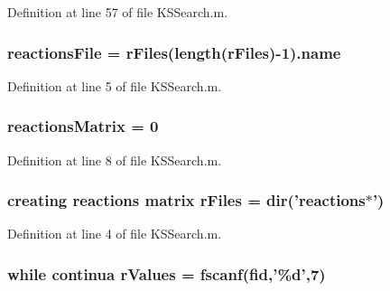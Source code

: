 Definition at line 57 of file K\-S\-Search.\-m.

\hypertarget{a00030_a4c72dba1fe2ee2fbcc699262a8d0c624}{
\subsubsection[{reactions\-File}]{\setlength{\rightskip}{0pt plus 5cm}reactions\-File = {\bf r\-Files}(length({\bf r\-Files})-\/1).{\bf name}}}\label{a00030_a4c72dba1fe2ee2fbcc699262a8d0c624}


Definition at line 5 of file K\-S\-Search.\-m.

\hypertarget{a00030_ac52097a2745fcef31eb175d2e9485845}{
\subsubsection[{reactions\-Matrix}]{\setlength{\rightskip}{0pt plus 5cm}reactions\-Matrix = 0}}\label{a00030_ac52097a2745fcef31eb175d2e9485845}


Definition at line 8 of file K\-S\-Search.\-m.

\hypertarget{a00030_ad75735665492cabd747370126464fddf}{
\subsubsection[{r\-Files}]{\setlength{\rightskip}{0pt plus 5cm}creating {\bf reactions} matrix r\-Files = dir('{\bf reactions}$\ast$')}}\label{a00030_ad75735665492cabd747370126464fddf}


Definition at line 4 of file K\-S\-Search.\-m.

\hypertarget{a00030_a436a6968124e560649654a4abbd9dac6}{
\subsubsection[{r\-Values}]{\setlength{\rightskip}{0pt plus 5cm}while {\bf continua} r\-Values = {\bf fscanf}({\bf fid},'\%d',7)}}\label{a00030_a436a6968124e560649654a4abbd9dac6}


